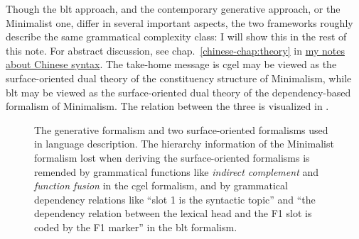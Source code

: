 \documentclass{article}
\newcommand*{\citechap}[1]{chap.~{#1}}
\newcommand*{\term}[1]{\emph{#1}}
\newcommand{\chinese}{\href{../Chinese/main.pdf}{my notes about Chinese syntax}}
\begin{document}
Though the \ac{blt} approach, and the contemporary generative approach, or the Minimalist one,
differ in several important aspects,
the two frameworks roughly describe the same grammatical complexity class:
I will show this in the rest of this note. 
For abstract discussion, see \citechap{\ref{chinese-chap:theory}} in \chinese. 
The take-home message is
\ac{cgel} may be viewed as the surface-oriented dual theory of the constituency structure of Minimalism,
while \ac{blt} may be viewed as the surface-oriented dual theory of the dependency-based formalism of Minimalism.
The relation between the three is visualized in .

\begin{figure}
    \centering
    
    \caption{The generative formalism and two surface-oriented formalisms used in language description.
    The hierarchy information of the Minimalist formalism lost when deriving the surface-oriented formalisms 
    is remended by grammatical functions 
    like \term{indirect complement} and \term{function fusion} in the \ac{cgel} formalism,
    and by grammatical dependency relations like ``slot 1 is the syntactic topic''
    and ``the dependency relation between the lexical head and the F1 slot is coded by the F1 marker'' 
    in the \ac{blt} formalism.}
    \label{fig:three-formalism}
\end{figure}
\end{document}
